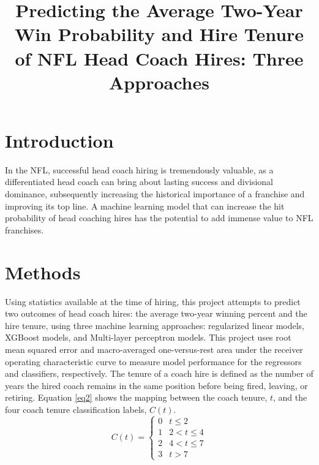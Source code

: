 \documentclass[conference]{IEEEtran}
\begin{document}
\title{Predicting the Average Two-Year Win Probability and Hire Tenure of NFL Head Coach Hires: Three Approaches}

\author{
}

\maketitle

\section{Introduction}
In the NFL, successful head coach hiring is tremendously valuable, as a differentiated head coach can bring about lasting success and divisional dominance, subsequently increasing the historical importance of a franchise and improving its top line. A machine learning model that can increase the hit probability of head coaching hires has the potential to add immense value to NFL franchises.

\section{Methods}
Using statistics available at the time of hiring, this project attempts to predict two outcomes of head coach hires: the average two-year winning percent and the hire tenure, using three machine learning approaches: regularized linear models, XGBoost models, and Multi-layer perceptron models. This project uses root mean squared error and macro-averaged one-versus-rest area under the receiver operating characteristic curve to measure model performance for the regressors and classifiers, respectively. The tenure of a coach hire is defined as the number of years the hired coach remains in the same position before being fired, leaving, or retiring. Equation \eqref{eq2} shows the mapping between the coach tenure, $t$, and the four coach tenure classification labels, $C(t)$.
\begin{equation}
        C(t)=
        \begin{cases}
            0 &t \leq 2 		\\
            1 &2 < t \leq 4 \\
            2 &4 < t \leq 7 \\
            3 &t > 7
        \end{cases}
        \label{eq2}
\end{equation}
\end{document}
